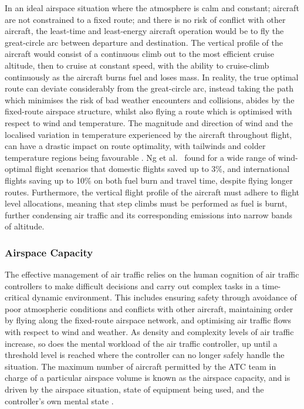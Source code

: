 In an ideal airspace situation where the atmosphere is calm and constant; aircraft are not constrained to a fixed route; and there is no risk of conflict with other aircraft, the least-time and least-energy aircraft operation would be to fly the great-circle arc between departure and destination. The vertical profile of the aircraft would consist of a continuous climb out to the most efficient cruise altitude, then to cruise at constant speed, with the ability to cruise-climb continuously as the aircraft burns fuel and loses mass. In reality, the true optimal route can deviate considerably from the great-circle arc, instead taking the path which minimises the risk of bad weather encounters and collisions, abides by the fixed-route airspace structure, whilst also flying a route which is optimised with respect to wind and temperature. The magnitude and direction of wind and the localised variation in temperature experienced by the aircraft throughout flight, can have a drastic impact on route optimality, with tailwinds and colder temperature regions being favourable \cite{Murrieta-Mendoza2014}. Ng et al.\ \cite{Ng2012} found for a wide range of wind-optimal flight scenarios that domestic flights saved up to 3\%, and international flights saving up to 10\% on both fuel burn and travel time, despite flying longer routes. Furthermore, the vertical flight profile of the aircraft must adhere to flight level allocations, meaning that step climbs must be performed as fuel is burnt, further condensing air traffic and its corresponding emissions into narrow bands of altitude. 

\subsubsection{Airspace Capacity}
The effective management of air traffic relies on the human cognition of air traffic controllers to make difficult decisions and carry out complex tasks in a time-critical dynamic environment. This includes ensuring safety through avoidance of poor atmospheric conditions and conflicts with other aircraft, maintaining order by flying along the fixed-route airspace network, and optimising air traffic flows with respect to wind and weather. As density and complexity levels of air traffic increase, so does the mental workload of the air traffic controller, up until a threshold level is reached where the controller can no longer safely handle the situation. The maximum number of aircraft permitted by the ATC team in charge of a particular airspace volume is known as the airspace capacity, and is driven by the airspace situation, state of equipment being used, and the controller's own mental state \cite{Majumdar2004}. 

